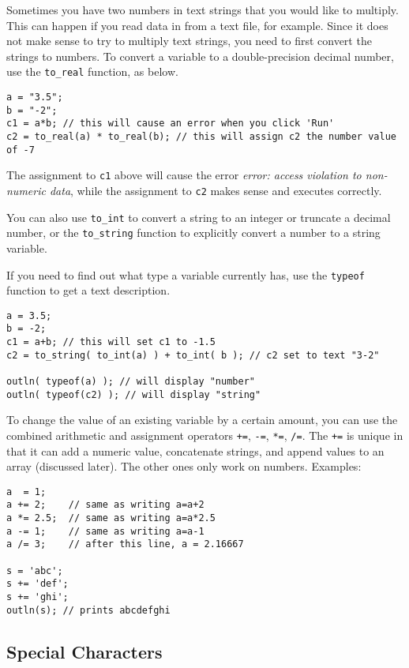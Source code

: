 \documentclass{article}
\begin{document}
Sometimes you have two numbers in text strings that you would like to multiply.  This can happen if you read data in from a text file, for example.  Since it does not make sense to try to multiply text strings, you need to first convert the strings to numbers.  To convert a variable to a double-precision decimal number, use the \texttt{to\_real} function, as below.

\begin{verbatim}
a = "3.5";
b = "-2";
c1 = a*b; // this will cause an error when you click 'Run'
c2 = to_real(a) * to_real(b); // this will assign c2 the number value of -7
\end{verbatim}

The assignment to \texttt{c1} above will cause the error \emph{error: access violation to non-numeric data}, while the assignment to \texttt{c2} makes sense and executes correctly.

You can also use \texttt{to\_int} to convert a string to an integer or truncate a decimal number, or the \texttt{to\_string} function to explicitly convert a number to a string variable.  

If you need to find out what type a variable currently has, use the \texttt{typeof} function to get a text description.

\begin{verbatim}
a = 3.5;
b = -2;
c1 = a+b; // this will set c1 to -1.5
c2 = to_string( to_int(a) ) + to_int( b ); // c2 set to text "3-2"

outln( typeof(a) ); // will display "number"
outln( typeof(c2) ); // will display "string"
\end{verbatim}

To change the value of an existing variable by a certain amount, you can use the combined arithmetic and assignment operators \texttt{+=}, \texttt{-=}, \texttt{*=}, \texttt{/=}.  The \texttt{+=} is unique in that it can add a numeric value, concatenate strings, and append values to an array (discussed later).  The other ones only work on numbers.  Examples:

\begin{verbatim}
a  = 1;
a += 2;    // same as writing a=a+2
a *= 2.5;  // same as writing a=a*2.5
a -= 1;    // same as writing a=a-1
a /= 3;    // after this line, a = 2.16667

s = 'abc';
s += 'def';
s += 'ghi';
outln(s); // prints abcdefghi
\end{verbatim}

\subsection{Special Characters}
\end{document}
